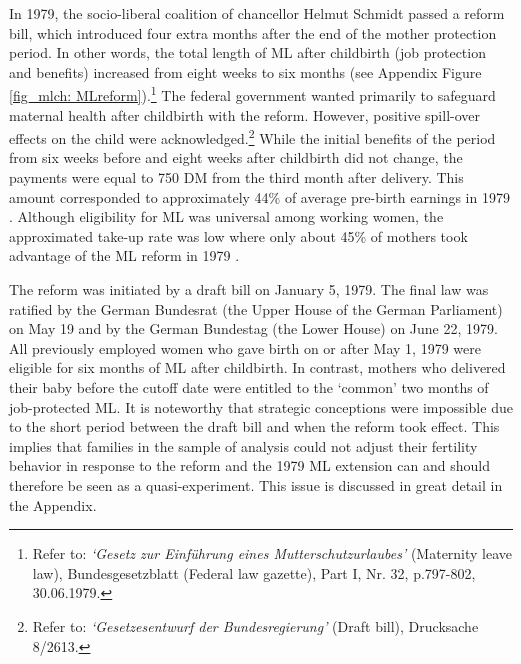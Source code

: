 In 1979, the socio-liberal coalition of chancellor Helmut Schmidt passed a reform bill, which introduced four extra months after the end of the mother protection period. In other words, the total length of ML after childbirth (job protection and benefits) increased from eight weeks to six months (see Appendix Figure \ref{fig_mlch: MLreform}).\footnote{Refer to: \textit{`Gesetz zur Einführung eines Mutterschutzurlaubes'} (Maternity leave law), Bundesgesetzblatt (Federal law gazette), Part I, Nr. 32, p.797-802, 30.06.1979.} The federal government wanted primarily to safeguard maternal health after childbirth with the reform. However, positive spill-over effects on the child were acknowledged.\footnote{Refer to: \textit{`Gesetzesentwurf der Bundesregierung'} (Draft bill), Drucksache 8/2613.} While the initial benefits of the period from six weeks before and eight weeks after childbirth did not change, the payments were equal to 750 DM from the third month after delivery. This amount corresponded to approximately 44\% of average pre-birth earnings in 1979 \citep{schonberg2014expansions}. Although eligibility for ML was universal among working women, the approximated take-up rate was low where only about 45\% of mothers took advantage of the ML reform in 1979 \citep{Dustmann2012}.%


The reform was initiated by a draft bill on January 5, 1979. The final law was ratified by the German Bundesrat (the Upper House of the German Parliament) on May 19 and by the German Bundestag (the Lower House) on June 22, 1979. All previously employed women who gave birth on or after May 1, 1979 were eligible for six months of ML after childbirth. In contrast, mothers who delivered their baby before the cutoff date were entitled to the `common' two months of job-protected ML. It is noteworthy that strategic conceptions were impossible due to the short period between the draft bill and when the reform took effect. This implies that families in the sample of analysis could not adjust their fertility behavior in response to the reform and the 1979 ML extension can and should therefore be seen as a quasi-experiment. This issue is discussed in great detail in the Appendix.


